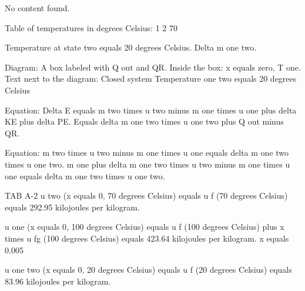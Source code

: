 No content found.

Table of temperatures in degrees Celsius:  
1  
2 70  

Temperature at state two equals 20 degrees Celsius. Delta m one two.  

Diagram:  
A box labeled with Q out and QR.  
Inside the box: x equals zero, T one.  
Text next to the diagram:  
Closed system  
Temperature one two equals 20 degrees Celsius  

Equation:  
Delta E equals m two times u two minus m one times u one plus delta KE plus delta PE.  
Equals delta m one two times u one two plus Q out minus QR.  

Equation:  
m two times u two minus m one times u one equals delta m one two times u one two.  
m one plus delta m one two times u two minus m one times u one equals delta m one two times u one two.  

TAB A-2  
u two (x equals 0, 70 degrees Celsius) equals u f (70 degrees Celsius) equals 292.95 kilojoules per kilogram.  

u one (x equals 0, 100 degrees Celsius) equals u f (100 degrees Celsius) plus x times u fg (100 degrees Celsius) equals 423.64 kilojoules per kilogram.  
x equals 0.005  

u one two (x equals 0, 20 degrees Celsius) equals u f (20 degrees Celsius) equals 83.96 kilojoules per kilogram.
